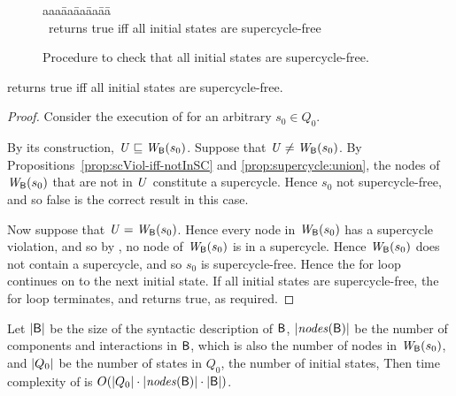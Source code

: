 \begin{figure}[ht]
\setcounter{lctr}{0}
\begin{tabbing}\label{alg:compute-scViol}
aaa\= aa\= aa\= aa\= aa\=\kill
{}\\
\cmnt\ returns true iff all initial states are supercycle-free\\
\lio{\ENDFOR;}
\end{tabbing}
\caption{Procedure to check that all initial states are supercycle-free.}
\label{fig:checkInitSCFree}
\end{figure}


\begin{proposition}
 returns true iff all initial states are supercycle-free.
\end{proposition}
%
\begin{proof}
Consider the execution of  for an arbitrary $s_0 \in Q_0$.

By its construction, $\mathit{U} \sqsubseteq \mathit{W}_{\mathsf{B}}({s_0})$.
Suppose that $\mathit{U} \ne  \mathit{W}_{\mathsf{B}}({s_0})$.
By Propositions~\ref{prop:scViol-iff-notInSC} and
\ref{prop:supercycle:union}, the nodes of $\mathit{W}_{\mathsf{B}}({s_0})$ that are not in $\mathit{U}$ constitute a supercycle.
Hence $s_0$ not supercycle-free, and so false is the correct result in this case.

Now suppose that $\mathit{U} = \mathit{W}_{\mathsf{B}}({s_0})$. Hence every node in $\mathit{W}_{\mathsf{B}}({s_0})$ has a supercycle violation, and so
by , no node of $\mathit{W}_{\mathsf{B}}({s_0})$ is in a 
supercycle. Hence  $\mathit{W}_{\mathsf{B}}({s_0})$ does not contain a supercycle, and so
$s_0$ is supercycle-free.
Hence the for loop continues on to the next initial state.
If all initial states are supercycle-free, the for loop terminates, and
 returns true, as required.
\end{proof}


Let
$|\mathsf{B}|$ be the size of the syntactic description of $\mathsf{B}$, 
$|\mathit{nodes}(\mathsf{B})|$ be the number of components and interactions in $\mathsf{B}$, which is also the number of nodes in $\mathit{W}_{\mathsf{B}}({s_0})$, and
$|Q_0|$ be the number of states in $Q_0$, \ie the number of initial states,
%
Then time complexity of  is 
$O(|Q_0| \cdot |\mathit{nodes}(\mathsf{B})| \cdot |\mathsf{B}|)$.


